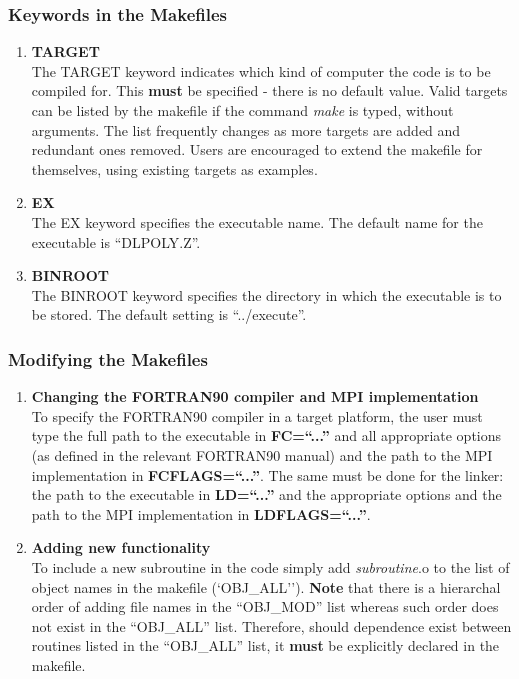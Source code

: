 \subsubsection{Keywords in the Makefiles}

\begin{enumerate}
\item {\bf TARGET} \\
The TARGET keyword indicates which kind of computer the code is to
be compiled for.  This {\bf must} be specified - there is no
default value.  Valid targets can be listed by the makefile if the
command {\em make} is typed, without arguments.  The list
frequently changes as more targets are added and redundant ones
removed.  Users are encouraged to extend the makefile for
themselves, using existing targets as examples. \\
\item {\bf EX} \\
The EX keyword specifies the executable name.  The default name
for the executable is ``DLPOLY.Z''. \\
\item {\bf BINROOT} \\
The BINROOT keyword specifies the directory in which the
executable is to be stored.  The default setting is
``../execute''.
\end{enumerate}

\subsubsection{Modifying the Makefiles}

\begin{enumerate}
\item {\bf Changing the FORTRAN90 compiler and MPI implementation} \\
To specify the FORTRAN90 compiler in a target platform, the user
must type the full path to the executable in {\bf FC=``...''} and
all appropriate options (as defined in the relevant FORTRAN90
manual) and the path to the MPI implementation in {\bf
FCFLAGS=``...''}. The same must be done for the linker: the
path to the executable in {\bf LD=``...''} and the appropriate
options and the path to the MPI implementation in {\bf
LDFLAGS=``...''}. \\
\item {\bf Adding new functionality} \\
To include a new subroutine in the code simply add {\em
subroutine}.o to the list of object names in the makefile
(`OBJ\_ALL'').  {\bf Note} that there is a hierarchal order of
adding file names in the ``OBJ\_MOD'' list whereas such order does
not exist in the ``OBJ\_ALL'' list.  Therefore, should dependence
exist between routines listed in the ``OBJ\_ALL'' list, it {\bf
must} be explicitly declared in the makefile.
\end{enumerate}

